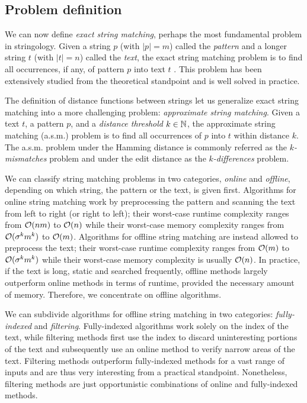 \subsection{Problem definition}

We can now define \emph{exact string matching}, perhaps the most fundamental problem in stringology.
Given a string $p$ (with $|p|=m$) called the \emph{pattern} and a longer string $t$ (with $|t|=n$) called the \emph{text}, the exact string matching problem is to find all occurrences, if any, of pattern $p$ into text $t$ \cite{Gusfield1997}.
This problem has been extensively studied from the theoretical standpoint and is well solved in practice.

The definition of distance functions between strings let us generalize exact string matching into a more challenging problem: \emph{approximate string matching}.
Given a text $t$, a pattern $p$, and a \emph{distance threshold} $k \in \mathbb {N}$, the approximate string matching (a.s.m.) problem is to find all occurrences of $p$ into $t$ within distance $k$.
The a.s.m. problem under the Hamming distance is commonly referred as the \emph{$k$-mismatches} problem and under the edit distance as the \emph{$k$-differences} problem.

We can classify string matching problems in two categories, \emph{online} and \emph{offline}, depending on which string, the pattern or the text, is given first.
Algorithms for online string matching work by preprocessing the pattern and scanning the text from left to right (or right to left); their worst-case runtime complexity ranges from $\mathcal{O}(nm)$ to $\mathcal{O}(n)$ while their worst-case memory complexity ranges from $\mathcal{O}(\sigma^k m^k)$ to $\mathcal{O}(m)$.
Algorithms for offline string matching are instead allowed to preprocess the text; their worst-case runtime complexity ranges from $\mathcal{O}(m)$ to $\mathcal{O}(\sigma^k m^k)$ while their worst-case memory complexity is usually $\mathcal{O}(n)$.
In practice, if the text is long, static and searched frequently, offline methods largely outperform online methods in terms of runtime, provided the necessary amount of memory. Therefore, we concentrate on offline algorithms.

We can subdivide algorithms for offline string matching in two categories: \emph{fully-indexed} and \emph{filtering}.
Fully-indexed algorithms work solely on the index of the text, while filtering methods first use the index to discard uninteresting portions of the text and subsequently use an online method to verify narrow areas of the text.
Filtering methods outperform fully-indexed methods for a vast range of inputs and are thus very interesting from a practical standpoint. Nonetheless, filtering methods are just opportunistic combinations of online and fully-indexed methods.

